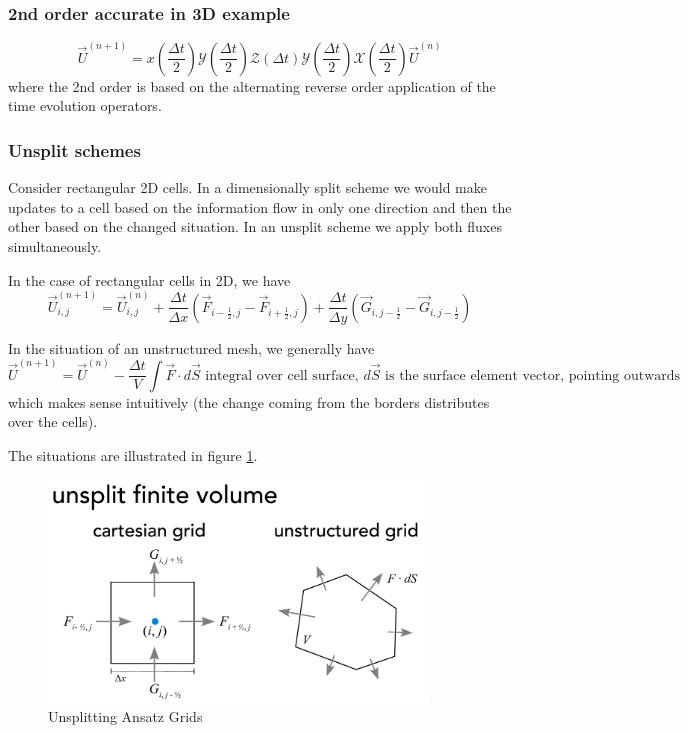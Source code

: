 \subsubsection{2nd order accurate in 3D example}
\begin{equation}
    \vec{U}^{(n+1)}=x\left(\frac{\Delta t}{2}\right) \mathcal{Y}\left(\frac{\Delta t}{2}\right) \mathcal{Z}(\Delta t) \mathcal{Y}\left(\frac{\Delta t}{2}\right) \mathcal{X}\left(\frac{\Delta t}{2}\right) \vec{U}^{(n)}
\end{equation}
where the 2nd order is based on the alternating reverse order application of
the time evolution operators.

\subsubsection{Unsplit schemes}
Consider rectangular 2D cells. In a dimensionally split scheme we would 
make updates to a cell based on the information flow in only one direction 
and then the other based on the changed situation. In an unsplit scheme we 
apply both fluxes simultaneously.

In the case of rectangular cells in 2D, we have
\begin{equation}
    \vec{U}_{i, j}^{(n+1)}=\vec{U}_{i, j}^{(n)}+\frac{\Delta t}{\Delta x}\left(\vec{F}_{i-\frac{1}{2}, j}-\vec{F}_{i+\frac{1}{2}, j}\right)+\frac{\Delta t}{\Delta y}\left(\vec{G}_{i, j-\frac{1}{2}}-\vec{G}_{i, j-\frac{1}{2}}\right)
\end{equation}

In the situation of an unstructured mesh, we generally have
\begin{equation}
    \vec{U}^{(n+1)}=\vec{U}^{(n)}-\frac{\Delta t}{V} \int \vec{F} \cdot d \vec{S} \text { integral over cell surface,  } d\vec{S} \text{ is the surface element vector, pointing outwards}
\end{equation}
which makes sense intuitively (the change coming from the
borders distributes over the cells).

The situations are illustrated in figure \ref{fig:usplit}.
\begin{figure}[htb!]
    \centering
    \includegraphics[width=0.9\textwidth]{figures/usplit.pdf}
    \caption{Unsplitting Ansatz Grids}
    \label{fig:usplit}
\end{figure}

